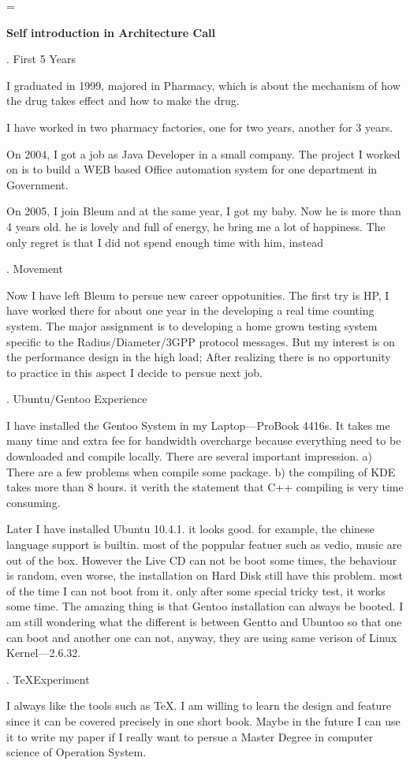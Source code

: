 
\hsize=29pc
\vsize=42pc
\topglue 0.5in
\magnification=
\centerline{\bf Self introduction in Architecture Call}

. First 5 Years

I graduated in 1999, majored in Pharmacy, which is about the mechanism of how the
drug takes effect and how to make the drug. 

I have worked in two pharmacy factories, one for two years, another for 3 years.

On 2004, I got a job as Java Developer in a small company. The project I worked on
is to build a WEB based Office automation system for one department in Government.

On 2005, I join Bleum and at the same year, I got my baby. Now he is more than 4 years old.
he is lovely and full of energy, he bring me a lot of happiness. The only regret is that 
I did not spend enough time with him, instead 

. Movement

Now I have left Bleum to persue new career oppotunities. The first try is HP, I have worked there
for about one year in the developing a real time counting system. The major assignment is to 
developing a  home grown testing system specific to the Radius/Diameter/3GPP protocol messages. 
But my interest is on the performance design in the high load; After realizing there is no opportunity
to practice in this aspect I decide to persue next job. 

. Ubuntu/Gentoo Experience

I have installed the Gentoo System in my Laptop---ProBook 4416s. It takes me many time and extra fee 
for bandwidth overcharge because everything need to be downloaded and compile locally. There are 
several important impression. a) There are a few problems when compile some package. b) the compiling of 
KDE takes more than 8 hours. it verith the statement that C++ compiling is very time consuming.

Later I have installed Ubuntu 10.4.1. it looks good. for example, the chinese language support is builtin.
most of the poppular featuer such as vedio, music are out of the box. However the Live CD can not be 
boot some times, the behaviour is random, even worse, the installation on Hard Disk still have this problem.
most of the time I can not boot from it. only after some special tricky test, it works some  time. The amazing
thing is that Gentoo installation can always be booted. I am still wondering what the different is between
Gentto and Ubuntoo so that one can boot and another one can not, anyway, they are using same verison of Linux
Kernel---2.6.32.

. \TeX Experiment

I always like the tools such as \TeX. I am willing to learn the design and feature since it can be covered precisely
in one short book. Maybe in the future I can use it to write my paper if I really want to persue a Master Degree in 
computer science of Operation System.


 \bye
